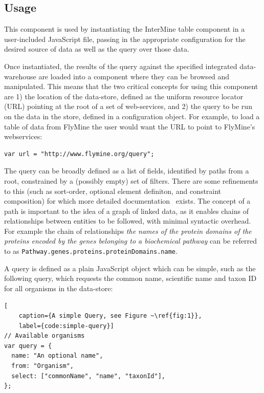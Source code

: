 \documentclass[10pt,a4paper,twocolumn]{article}
\begin{document}
\subsection*{Usage}

This component is used by instantiating the InterMine table component in a
user-included JavaScript file, passing in the appropriate configuration for the
desired source of data as well as the query over those data.

Once instantiated, the results of the query against the specified integrated
data-warehouse are loaded into a component where they can be browsed and
manipulated.  This means that the two critical concepts for using this component
are 1) the location of the data-store, defined as the uniform resource locator
(URL) pointing at the root of a set of web-services, and 2) the query to be run
on the data in the store, defined in a configuration object. For example, to
load a table of data from FlyMine the user would want the URL to point to
FlyMine's webservices:

\begin{lstlisting}[caption={Specifying the Data-Store}, label={code:set-url}]
var url = "http://www.flymine.org/query";
\end{lstlisting}

The query can be broadly defined as a list of fields, identified by paths from a
root, constrained by a (possibly empty) set of filters. There are some
refinements to this (such as sort-order, optional element definiton, and
constraint composition) for which more detailed documentation~\cite{site:pqdocs}
exists. The concept of a path is important to the idea of a graph of linked
data, as it enables chains of relationships between entities to be followed,
with minimal syntactic overhead. For example the chain of relationships
\emph{the names of the protein domains of the proteins encoded by the genes
belonging to a biochemical pathway} can be referred to as
\texttt{Pathway.genes.proteins.proteinDomains.name}.

A query is defined as a plain JavaScript object which can be simple, such as the 
following query, which requests the common name, scientific name and
taxon ID for all organisms in the data-store:

\begin{lstlisting}[
    caption={A simple Query, see Figure ~\ref{fig:1}},
    label={code:simple-query}]
// Available organisms
var query = {
  name: "An optional name",
  from: "Organism",
  select: ["commonName", "name", "taxonId"],
};
\end{lstlisting}
\end{document}
